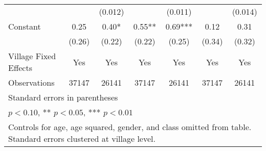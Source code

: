 \begin{sidewaystable}[htbp]
\begin{tabular}{l*{6}{c}}
                &            &  (0.012)   &            &  (0.011)   &            &  (0.014)   \\
Constant        &     0.25   &     0.40*  &     0.55** &     0.69***&     0.12   &     0.31   \\
                &   (0.26)   &   (0.22)   &   (0.22)   &   (0.25)   &   (0.34)   &   (0.32)   \\
Village Fixed Effects&      Yes   &      Yes   &      Yes   &      Yes   &      Yes   &      Yes   \\
\midrule
Observations    &    37147   &    26141   &    37147   &    26141   &    37147   &    26141   \\
\bottomrule
\multicolumn{7}{l}{\footnotesize Standard errors in parentheses}\\
\multicolumn{7}{l}{\footnotesize * \(p<0.10\), ** \(p<0.05\), *** \(p<0.01\)}\\
\multicolumn{7}{l}{\footnotesize Controls for age, age squared, gender, and class omitted from table. Standard errors clustered at village level.}\\
\end{tabular}
\end{sidewaystable}
